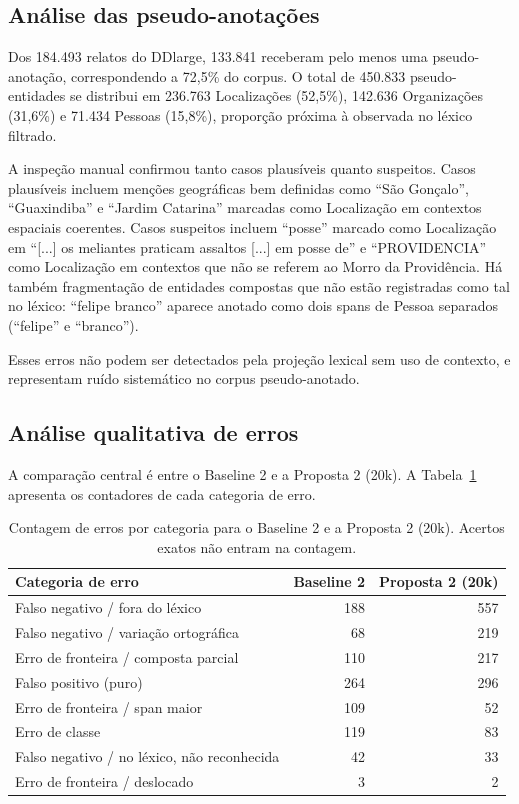 \documentclass[12pt,a4paper]{article}
\begin{document}
\subsection{Análise das pseudo-anotações}

Dos 184.493 relatos do DDlarge, 133.841 receberam pelo menos uma pseudo-anotação,
correspondendo a 72,5\% do corpus. O total de 450.833 pseudo-entidades se
distribui em 236.763 Localizações (52,5\%), 142.636 Organizações (31,6\%) e
71.434 Pessoas (15,8\%), proporção próxima à observada no léxico filtrado.

A inspeção manual confirmou tanto casos plausíveis quanto suspeitos. Casos
plausíveis incluem menções geográficas bem definidas como ``São Gonçalo'',
``Guaxindiba'' e ``Jardim Catarina'' marcadas como Localização em contextos
espaciais coerentes. Casos suspeitos incluem ``posse'' marcado como
Localização em ``[...] os meliantes praticam assaltos [...] em posse de'' e
``PROVIDENCIA'' como Localização em contextos que não se referem ao Morro da
Providência. Há também fragmentação de entidades compostas que não estão
registradas como tal no léxico: ``felipe branco'' aparece anotado como dois
spans de Pessoa separados (``felipe'' e ``branco'').

Esses erros não podem ser detectados pela projeção lexical sem uso de contexto,
e representam ruído sistemático no corpus pseudo-anotado.

\subsection{Análise qualitativa de erros}

A comparação central é entre o Baseline 2 e a Proposta 2 (20k). A
Tabela~\ref{tab:erros} apresenta os contadores de cada categoria de erro.

\begin{table}[H]
\centering
\caption{Contagem de erros por categoria para o Baseline 2 e a Proposta 2 (20k).
Acertos exatos não entram na contagem.}
\label{tab:erros}
\small
\begin{tabular}{lrr}
\toprule
\textbf{Categoria de erro} & \textbf{Baseline 2} & \textbf{Proposta 2 (20k)} \\
\midrule
Falso negativo / fora do léxico              & 188 & 557 \\
Falso negativo / variação ortográfica        &  68 & 219 \\
Erro de fronteira / composta parcial         & 110 & 217 \\
Falso positivo (puro)                        & 264 & 296 \\
Erro de fronteira / span maior               & 109 &  52 \\
Erro de classe                               & 119 &  83 \\
Falso negativo / no léxico, não reconhecida  &  42 &  33 \\
Erro de fronteira / deslocado                &   3 &   2 \\
\bottomrule
\end{tabular}
\end{table}
\end{document}
